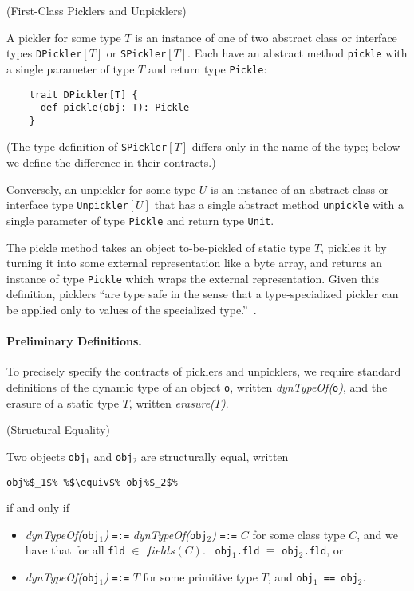 \documentclass[preprint,10pt]{sigplanconf}
\theoremstyle{definition}
\newcommand{\term}[1]{\mbox{\texttt{#1}}}
\newcommand{\itl}[1]{\mbox{\textit{#1}}}
\begin{document}
\begin{defn}(First-Class Picklers and Unpicklers)

A pickler for some type $T$ is an instance of one of two abstract class or
interface types \term{DPickler}$[T]$ or \term{SPickler}$[T]$. Each have an
abstract method \verb|pickle| with a single parameter of type $T$ and return
type \term{Pickle}:

\begin{lstlisting}
    trait DPickler[T] {
      def pickle(obj: T): Pickle
    }
\end{lstlisting}

\noindent(The type definition of \term{SPickler}$[T]$ differs only in the name of the type;
below we define the difference in their contracts.)

Conversely, an unpickler for some type $U$ is an instance of an abstract class
or interface type \term{Unpickler}$[U]$ that has a single abstract method
\verb|unpickle| with a single parameter of type \term{Pickle} and return type
\term{Unit}.
\end{defn}

The pickle method takes an object to-be-pickled of static type $T$, pickles it
by turning it into some external representation like a byte array, and returns
an instance of type \term{Pickle} which wraps the external representation. Given this
definition, picklers ``are type safe in the sense that a type-specialized
pickler can be applied only to values of the specialized type.''~\cite{Elsman2005}.

\paragraph{Preliminary Definitions.} To precisely specify the contracts of
picklers and unpicklers, we require standard definitions of the dynamic type
of an object \term{o}, written \itl{dynTypeOf(}\term{o}\itl{)}, and the erasure of a
static type $T$, written \itl{erasure(}$T$\itl{)}.

\begin{defn}(Structural Equality)

\noindent Two objects \term{obj}$_1$ and \term{obj}$_2$ are structurally equal, written

\begin{lstlisting}[escapechar=\%]
obj%$_1$% %$\equiv$% obj%$_2$%
\end{lstlisting}

\noindent if and only if

\begin{itemize}
\item \itl{dynTypeOf(}\term{obj$_1$}\itl{)} \term{=:=} \itl{dynTypeOf(}\term{obj$_2$}\itl{)} \term{=:=} $C$
      for some class type $C$, and we have that for all \term{fld} $\in$ $\textit{fields}(C)$.
      ~\term{obj$_1$.fld} $\equiv$ \term{obj$_2$.fld}, or
\item \itl{dynTypeOf(}\term{obj$_1$}\itl{)} \term{=:=} $T$ for some primitive type $T$, and \term{obj$_1$ == obj$_2$}.
\end{itemize}
\end{defn}
\end{document}
